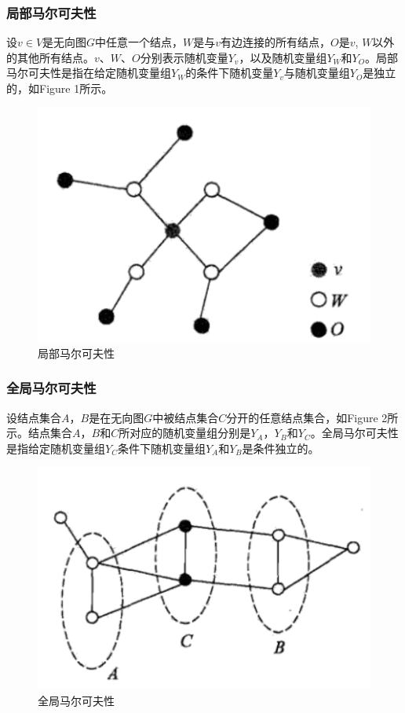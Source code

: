 \documentclass[12pt]{report}
\begin{document}
			\subsubsection{局部马尔可夫性}
				
				设$v\in{V}$是无向图$G$中任意一个结点，$W$是与$v$有边连接的所有结点，$O$是$v$, $W$以外的其他所有结点。$v$、$W$、$O$分别表示随机变量$Y_v$，以及随机变量组$Y_W$和$Y_O$。局部马尔可夫性是指在给定随机变量组$Y_W$的条件下随机变量$Y_v$与随机变量组$Y_O$是独立的，如Figure 1所示。
	
				\begin{figure}[H]
					\centering
					\includegraphics[scale=0.6]{img/1.png}
					\caption{局部马尔可夫性} 
					\label{img}
				\end{figure}
			
			\subsubsection{全局马尔可夫性}
			
				设结点集合$A$，$B$是在无向图$G$中被结点集合$C$分开的任意结点集合，如Figure 2所示。结点集合$A$，$B$和$C$所对应的随机变量组分别是$Y_A$，$Y_B$和$Y_C$。全局马尔可夫性是指给定随机变量组$Y_C$条件下随机变量组$Y_A$和$Y_B$是条件独立的。
				
				\begin{figure}[H]
					\centering
					\includegraphics[scale=0.6]{img/2.png}
					\caption{全局马尔可夫性}
					\label{img}
				\end{figure}
			
\end{document}
